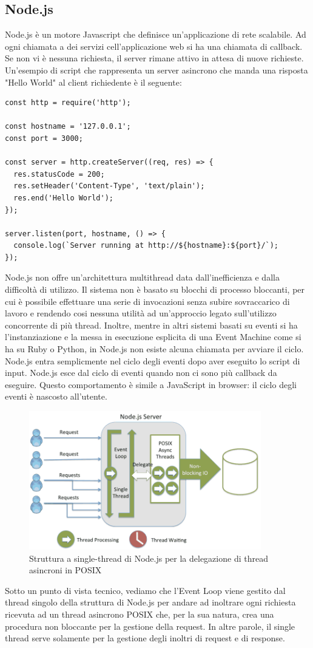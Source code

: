 \subsection{Node.js}
Node.js è un motore Javascript che definisce un'applicazione di rete scalabile. Ad ogni chiamata a dei servizi cell'applicazione web si ha una chiamata di callback. Se non vi è nessuna richiesta, il server rimane attivo in attesa di nuove richieste. 
Un'esempio di script che rappresenta un server asincrono che manda una risposta "Hello World" al client richiedente è il seguente:
\begin{lstlisting}
const http = require('http');

const hostname = '127.0.0.1';
const port = 3000;

const server = http.createServer((req, res) => {
  res.statusCode = 200;
  res.setHeader('Content-Type', 'text/plain');
  res.end('Hello World');
});

server.listen(port, hostname, () => {
  console.log(`Server running at http://${hostname}:${port}/`);
});
\end{lstlisting}
Node.js non offre un'architettura multithread data dall'inefficienza e dalla difficoltà di utilizzo. Il sistema non è basato su blocchi di processo bloccanti, per cui è possibile effettuare una serie di invocazioni senza subire sovraccarico di lavoro e rendendo cosi nessuna utilità ad un'approccio legato sull'utilizzo concorrente di più thread. Inoltre, mentre in altri sistemi basati su eventi si ha l'instanziazione e la messa in esecuzione esplicita di una Event Machine come si ha su Ruby o Python, in Node.js non esiste alcuna chiamata per avviare il ciclo. Node.js entra semplicmente nel ciclo degli eventi dopo aver eseguito lo script di input. Node.js esce dal ciclo di eventi quando non ci sono più callback da eseguire. Questo comportamento è simile a JavaScript in browser: il ciclo degli eventi è nascosto all'utente.
\begin{figure}[h]
    \centering
    \includegraphics[width=0.9\textwidth]{img/node-js-structure.png}
    \caption{Struttura a single-thread di Node.js per la delegazione di thread asincroni in POSIX}
    \label{fig:async-node}
\end{figure}
 Sotto un punto di vista tecnico, vediamo che l'Event Loop viene gestito dal thread singolo della struttura di Node.js per andare ad inoltrare ogni richiesta ricevuta ad un thread asincrono POSIX che, per la sua natura, crea una procedura non bloccante per la gestione della request. In altre parole, il single thread serve solamente per la gestione degli inoltri di request e di response. 
\newpage
